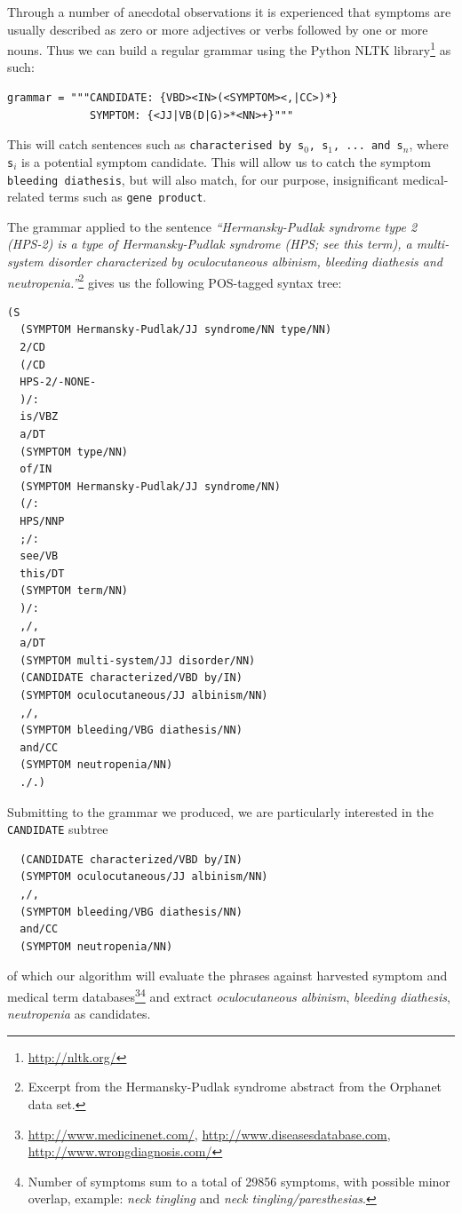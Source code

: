 \documentclass[10pt,letterpaper,final]{article}
\begin{document}
Through a number of anecdotal observations it is experienced that
symptoms are usually described as zero or more adjectives or verbs
followed by one or more nouns. Thus we can build a regular grammar using the Python NLTK
library\footnote{\url{http://nltk.org/}} as such:
\begin{lstlisting}
grammar = """CANDIDATE: {VBD><IN>(<SYMPTOM><,|CC>)*}
             SYMPTOM: {<JJ|VB(D|G)>*<NN>+}"""
\end{lstlisting}
This will catch sentences such as \texttt{characterised by s$_{0}$,
s$_{1}$, ... and s$_{n}$}, where \texttt{s$_{i}$} is a potential symptom
candidate.
This will allow us to catch the symptom \texttt{bleeding diathesis}, but
will also match, for our purpose, insignificant medical-related terms
such as \texttt{gene product}.


The grammar applied to the sentence \textit{``Hermansky-Pudlak syndrome
type 2 (HPS-2) is a type of Hermansky-Pudlak syndrome (HPS; see this
term), a multi-system disorder characterized by oculocutaneous albinism,
bleeding diathesis and neutropenia.''}\footnote{Excerpt from the
Hermansky-Pudlak syndrome abstract from the Orphanet data set.} gives us
the following POS-tagged syntax tree:
\begin{lstlisting}
(S
  (SYMPTOM Hermansky-Pudlak/JJ syndrome/NN type/NN)
  2/CD
  (/CD
  HPS-2/-NONE-
  )/:
  is/VBZ
  a/DT
  (SYMPTOM type/NN)
  of/IN
  (SYMPTOM Hermansky-Pudlak/JJ syndrome/NN)
  (/:
  HPS/NNP
  ;/:
  see/VB
  this/DT
  (SYMPTOM term/NN)
  )/:
  ,/,
  a/DT
  (SYMPTOM multi-system/JJ disorder/NN)
  (CANDIDATE characterized/VBD by/IN)
  (SYMPTOM oculocutaneous/JJ albinism/NN)
  ,/,
  (SYMPTOM bleeding/VBG diathesis/NN)
  and/CC
  (SYMPTOM neutropenia/NN)
  ./.)
\end{lstlisting}
Submitting to the grammar we produced, we are particularly interested in
the \texttt{CANDIDATE} subtree
\begin{lstlisting}
  (CANDIDATE characterized/VBD by/IN)
  (SYMPTOM oculocutaneous/JJ albinism/NN)
  ,/,
  (SYMPTOM bleeding/VBG diathesis/NN)
  and/CC
  (SYMPTOM neutropenia/NN)
\end{lstlisting}
of which our algorithm will evaluate the phrases against harvested
symptom and medical term
databases\footnote{\url{http://www.medicinenet.com/},
\url{http://www.diseasesdatabase.com},
\url{http://www.wrongdiagnosis.com/}}\footnote{Number of symptoms sum to
a total of 29856 symptoms, with possible minor overlap, example:
\textit{neck tingling} and \textit{neck tingling/paresthesias}.} and extract
\textit{oculocutaneous albinism}, \textit{bleeding diathesis},
\textit{neutropenia} as candidates.
\end{document}
